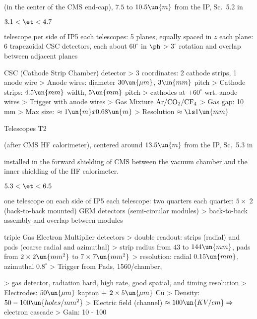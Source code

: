 (in the center of the CMS end-cap), $7.5$ to $10.5\un{m}$ from the IP, Sc.~5.2 in 

\> $3.1 < \et < 4.7$

 telescope per side of IP5
\> each telescopes: 5 planes, equally spaced in $z$
\> each plane: 6 trapezoidal CSC detectors, each about $60^\circ$ in $\ph$
\>> $3^\circ$ rotation and overlap between adjacent planes

\> CSC (Cathode Strip Chamber) detector
\>> 3 coordinates: 2 cathode strips, 1 anode wire
\>> Anode wires: diameter $30\un{\mu m}$, $3\un{mm}$ pitch
\>> Cathode strips: $4.5\un{mm}$ width, $5\un{mm}$ pitch
\>> cathodes at $\pm 60^\circ$ wrt. anode wires
\>> Trigger with anode wires
\>> Gas Mixture $\rm Ar/CO_2/CF_4$
\>> Gas gap: 10 mm
\>> Max size: $\approx 1\un{m} x 0.68\un{m}$
\>> Resolution $\approx\ls 1\un{mm}$


\bmfig
{}
\emfig


\caption{Telescopes T2}

(after CMS HF calorimeter), centered around $13.5\un{m}$ from the IP, Sc.~5.3 in 

\> installed in the forward shielding of CMS between the vacuum chamber and the inner shielding of the HF calorimeter.

\> $5.3 < \et < 6.5$

\> one telescope on each side of IP5
\> each telescope: two quarters
\> each quarter: $5\times$ 2 (back-to-back mounted) GEM detectors (semi-circular modules)
\>> back-to-back assembly and overlap between modules

\> triple Gas Electron Multiplier detectors
\>> double readout: strips (radial) and pads (coarse radial and azimuthal)
\>> strip radius from $43$ to $144\un{mm}$, pads from $2\times 2\un{mm^2}$ to $7\times 7\un{mm^2}$
\>> resolution: radial $0.15\un{mm}$, azimuthal $0.8^\circ$
\>> Trigger from Pads, 1560/chamber,

\>> gas detector, radiation hard, high rate, good spatial, and timing resolution
\>> Electrodes: $50\un{\mu m}$ kapton + $2\times 5\un{\mu m}$ Cu
\>> Density: $50-100\un{holes/mm^2}$
\>> Electric field (channel) $\approx 100\un{KV/cm} \Rightarrow$ electron cascade
\>> Gain: 10 - 100


\bmfig
{}
\emfig


